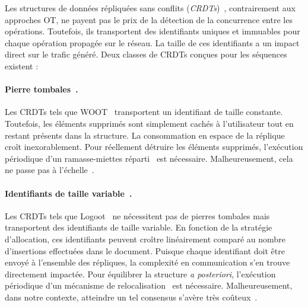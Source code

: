 Les structures de données répliquées sans conflits
(\emph{CRDTs})~\cite{burckhardt2014replicated, shapiro2011comprehensive,
shapiro2011conflict}, contrairement aux approches OT, ne payent pas le prix de
la détection de la concurrence entre les opérations. Toutefois, ils transportent
des identifiants uniques et immuables pour chaque opération propagée sur le
réseau. La taille de ces identifiants a un impact direct sur le trafic généré.
Deux classes de CRDTs conçues pour les séquences existent :

\paragraph{Pierre tombales~\cite{ahmed2011evaluating, attiya2016specification,
conway2014language, grishchenko2010deep, oster2006data, roh2011replicated,
weiss2007wooki, wu2010partial, yu2012stringwise}.} Les CRDTs tels que
WOOT~\cite{oster2006data} transportent un identifiant de taille constante.  
Toutefois, les éléments supprimés sont simplement cachés à l'utilisateur tout en
restant présents dans la structure. La consommation en espace de la réplique
croît inexorablement.
Pour réellement détruire les éléments supprimés, l'exécution périodique d'un
ramasse-miettes réparti~\cite{abdullahi1998garbage} est
nécessaire. Malheureusement, cela ne passe pas à
l'échelle~\cite{abdullahi1998garbage}.

\paragraph{Identifiants de taille variable~\cite{andre2013supporting,
 preguica2009commutative, weiss2009logoot}.} Les CRDTs tels que
Logoot~\cite{weiss2009logoot} ne nécessitent pas de pierres tombales mais
transportent des identifiants de taille variable. En fonction de la stratégie
d'allocation, ces identifiants peuvent croître linéairement comparé au nombre
d'insertions effectuées dans le document. Puisque chaque identifiant doit être
envoyé à l'ensemble des répliques, la complexité en communication s'en trouve
directement impactée. Pour équilibrer la structure \emph{a posteriori},
l'exécution périodique d'un mécanisme de relocalisation~\cite{letia2009crdts}
est nécessaire. Malheureusement, dans notre contexte, atteindre un tel consensus
s'avère très coûteux~\cite{mostefaoui2015signature}.

